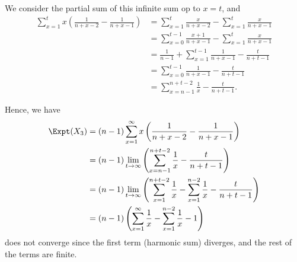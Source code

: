 \begin{enumerate}
          We consider the partial sum of this infinite sum op to \(x = t\), and
          \begin{align*}
              \sum_{x = 1}^{t} x \left(\frac{1}{n + x - 2} - \frac{1}{n + x - 1}\right) & = \sum_{x = 1}^{t} \frac{x}{n + x - 2} - \sum_{x = 1}^{t} \frac{x}{n + x - 1}         \\
                                                                                        & = \sum_{x = 0}^{t - 1} \frac{x + 1}{n + x - 1} - \sum_{x = 1}^{t} \frac{x}{n + x - 1} \\
                                                                                        & = \frac{1}{n - 1} + \sum_{x = 1}^{t - 1} \frac{1}{n + x - 1} - \frac{t}{n + t - 1}    \\
                                                                                        & = \sum_{x = 0}^{t - 1} \frac{1}{n + x - 1} - \frac{t}{n + t - 1}                      \\
                                                                                        & = \sum_{x = n - 1}^{n + t - 2} \frac{1}{x} - \frac{t}{n + t - 1}.
          \end{align*}

          Hence, we have
          \begin{align*}
              \Expt(X_3) & = (n - 1) \sum_{x = 1}^{\infty} x \left(\frac{1}{n + x - 2} - \frac{1}{n + x - 1}\right)                                                 \\
                         & = (n - 1) \lim_{t \to \infty} \left(\sum_{x = n - 1}^{n + t - 2} \frac{1}{x} - \frac{t}{n + t - 1}\right)                                \\
                         & = (n - 1) \lim_{t \to \infty} \left(\sum_{x = 1}^{n + t - 2} \frac{1}{x} - \sum_{x = 1}^{n - 2} \frac{1}{x} - \frac{t}{n + t - 1}\right) \\
                         & = (n - 1) \left(\sum_{x = 1}^{\infty} \frac{1}{x} - \sum_{x = 1}^{n - 2} \frac{1}{x} - 1\right)
          \end{align*}
          does not converge since the first term (harmonic sum) diverges, and the rest of the terms are finite.
\end{enumerate}